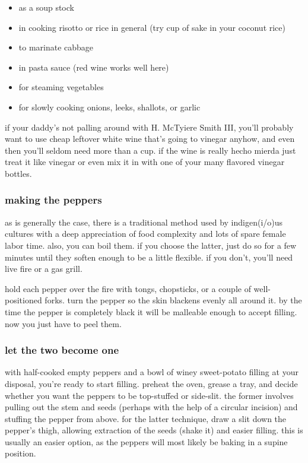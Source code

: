 \begin{itemize}
  \item as a soup stock 
  \item in cooking risotto or rice in general (try \onehalf cup of sake in your coconut rice)
  \item to marinate cabbage
  \item in pasta sauce (red wine works well here)
  \item for steaming vegetables
  \item for slowly cooking onions, leeks, shallots, or garlic
\end{itemize}

if your daddy's not palling around with H. McTyiere Smith III, you'll probably 
want to use cheap leftover white wine that's going to vinegar anyhow, and even 
then you'll seldom need more than a cup. if the wine is really \gls{hecho 
mierda} just treat it like vinegar 
or even mix it in with one of your many flavored vinegar bottles.

\subsubsection{making the peppers}

as is generally the case, there is a traditional method used by indigen(i/o)us 
cultures with a deep appreciation of food complexity and lots of spare female 
labor time. also, you can boil them. if you choose the latter, just do so for 
a few minutes until they soften enough to be a little flexible. if you don't, 
you'll need live fire or a gas grill.

hold each pepper over the fire with tongs, chopsticks, or a couple of 
well-positioned forks. turn the pepper so the skin blackens evenly all around 
it. by the time the pepper is completely black it will be malleable enough to 
accept filling. now you just have to peel them.

\subsubsection{let the two become one}

with half-cooked empty peppers and a bowl of winey sweet-potato filling at 
your disposal, you're ready to start filling. preheat the oven, grease a tray, 
and decide whether you want the peppers to be top-stuffed or side-slit. the 
former involves pulling out the stem and seeds (perhaps with the help of a 
circular incision) and stuffing the pepper from above. for the latter 
technique, draw a slit down the pepper's thigh, allowing extraction of the 
seeds (shake it) and easier filling. this is usually an easier option, as the 
peppers will most likely be baking in a supine position.

